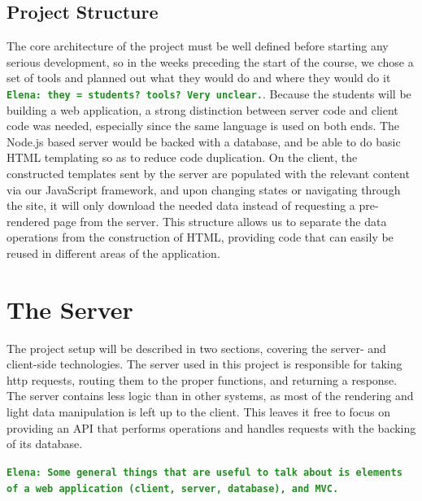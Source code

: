 \documentclass[12pt]{article}
\newcommand{\comment}[1]{{\bf \tt  {#1}}}
\newcommand{\emcomment}[1]{\textcolor{ForestGreen}{\comment{Elena: {#1}}}}
\begin{document}
\subsection{Project Structure}\label{sec:structure}
The core architecture of the project must be well defined before starting any serious development, so in the weeks preceding the start of the course, we chose a set of tools and planned out what they would do and where they would do it \emcomment{they = students? tools? Very unclear.}. Because the students will be building a web application, a strong distinction between server code and client code was needed, especially since the same language is used on both ends. The Node.js based server would be backed with a database, and be able to do basic HTML templating so as to reduce code duplication. On the client, the constructed templates sent by the server are populated with the relevant content via our JavaScript framework, and upon changing states or navigating through the site, it will only download the needed data instead of requesting a pre-rendered page from the server. This structure allows us to separate the data operations from the construction of HTML, providing code that can easily be reused in different areas of the application.

\section{The Server}\label{sec:server}
The project setup will be described in two sections, covering the server- and client-side technologies. The server used in this project is responsible for taking http requests, routing them to the proper functions, and returning a response. The server contains less logic than in other systems, as most of the rendering and light data manipulation is left up to the client. This leaves it free to focus on providing an API that performs operations and handles requests with the backing of its database.


\emcomment{Some general things that are useful to talk about is elements of a web application (client, server, database), and MVC.}
\end{document}
